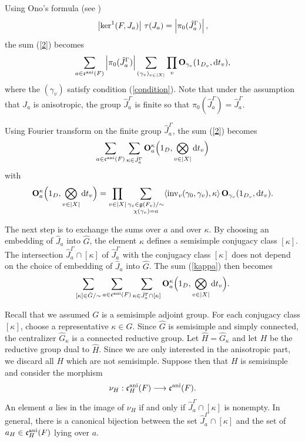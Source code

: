 \documentclass[12pt,english]{smfart}
\numberwithin{equation}{subsection}
\theoremstyle{remark}
\newcommand\frakc{{\mathfrak c}}
\newcommand\bfO{{\mathbf O}}
\newcommand\ani{{\rm ani}}
\begin{document}
Using Ono's formula (see \cite{O})
\begin{equation}\label{Ono}
\left|{\rm ker}^1(F,J_a)\right|\, \tau(J_a)
=\left|\pi_0(\hat J_a^\Gamma)\right|,
\end{equation}
the sum (\ref{2}) becomes
\begin{equation}
\sum_{a\in\frakc^\ani(F)}\left|\pi_0(\hat J_a^\Gamma)\right|
\sum_{(\gamma_v)_{v\in|X|}} \prod_v \bfO_{\gamma_v}(1_{D_v},{\rm d}t_v),
\end{equation}
where the $(\gamma_v)$ satisfy condition (\ref{condition}). Note that under the assumption that $J_a$ is anisotropic, the group $\hat J_a^\Gamma$ is finite so that $\pi_0(\hat J_a^\Gamma)=\hat J_a^\Gamma$.

Using Fourier transform on the finite group $\hat J_a^\Gamma$, the sum (\ref{2}) becomes
\begin{equation}\label{kappa}
\sum_{a\in\frakc^\ani(F)} \sum_{\kappa \in \hat J_a^\Gamma}
\bfO^\kappa_a\Bigl(1_D,\bigotimes_{v\in|X|}{\rm d}t_v\Bigr)
\end{equation}
with
\begin{equation}
{\bf O}^\kappa_a\Bigl(1_D,\bigotimes_{v\in|X|}{\rm d}t_v\Bigr)=\prod_{v\in|X|}
\sum_{\substack{\gamma_v\in {\mathfrak g}(F_v)/{\sim}\\ \chi(\gamma_v)=a}}
\langle {\rm inv}_v(\gamma_0,\gamma_v),\kappa\rangle\, {\bf O}_{\gamma_v}(1_{D_v},{\rm d}t_v).
\end{equation}

The next step is to exchange the sums over $a$ and over $\kappa$. By choosing an embedding of $\hat J_a$ into $\hat G$, the element $\kappa$ defines a semisimple conjugacy class $[\kappa]$. The intersection $\hat J_a^{\Gamma}\cap [\kappa]$ of $\hat J_a^{\Gamma}$ with the conjugacy class $[\kappa]$ does not depend on the choice of embedding of $\hat J_a$ into $\hat G$. The sum (\ref{kappa}) then becomes
\begin{equation}\label{[kappa]}
\sum_{[\kappa]\in \hat G/\sim} \sum_{a\in \frakc^{\rm ani}(F)}
\sum_{\kappa\in \hat J_a^\Gamma \cap [\kappa]} {\bf O}^\kappa_a\Bigl(1_D,\bigotimes_{v\in|X|}{\rm d}t_v\Bigr).
\end{equation}

Recall that we assumed $G$ is a semisimple adjoint group. For each conjugacy class $[\kappa]$, choose a representative $\kappa\in\hat G$. Since $\hat G$ is semisimple and simply connected, the centralizer $\hat G_\kappa$ is a connected reductive group. Let $\hat H=\hat G_\kappa$ and let $H$ be the reductive group dual to $\hat H$. Since we are only interested in the anisotropic part, we discard all $H$ which are not semisimple. Suppose then that $H$ is semisimple and consider the morphism
$$\nu_H:\frakc_H^\ani(F)\longrightarrow \frakc^\ani(F).$$
An element $a$ lies in the image of $\nu_{H}$ if and only if $\hat J_a^\Gamma \cap [\kappa]$ is nonempty. In general, there is a canonical bijection between the set $\hat J_a^\Gamma \cap [\kappa]$ and the set of $a_H\in\frakc_H^\ani(F)$ lying over $a$.
\end{document}
